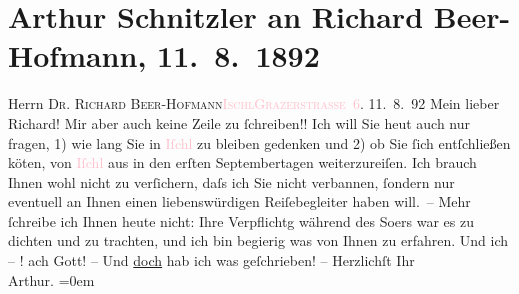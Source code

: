 

               \section[Arthur Schnitzler an Richard Beer-Hofmann, 11. 8. 1892]{ Arthur Schnitzler an Richard Beer-Hofmann, 11. 8. 1892}\nopagebreak{}\rehead{ }\normalsize\beginnumbering{} \toendnotes[C]{\smallbreak\pagebreak[2]} 
\pstart{}{\pb}Herrn \textsc{Dr. Richard
                     Beer-Hofmann}\pend{}\pstart{}\textsc{\textcolor{pink}{Ischl}{}\ledrightnote{\textcolor{pink}{Bad Ischl}}}\pend{}\pstart{}\textsc{\textcolor{pink}{Grazerstraße 6}{}\ledrightnote{\textcolor{pink}{Grazer Straße}}}.\pend{}{\bigskip}\pstart
           \raggedleft{}{\pb}11. 8. 92\pend
           \pstart
           Mein lieber Richard! Mir aber auch keine Zeile zu ſchreiben!! Ich
               will Sie heut auch nur fragen, 1) wie lang Sie in \textcolor{pink}{Iſchl}{}\ledrightnote{\textcolor{pink}{Bad Ischl}} zu bleiben gedenken und 2) ob Sie ſich entſchließen kö{\geminationn}ten, von \textcolor{pink}{Iſchl}{}\ledrightnote{\textcolor{pink}{Bad Ischl}} aus in
               den erſten Septembertagen weiterzureiſen. Ich brauch Ihnen wohl nicht zu verſichern,
               daſs ich Sie nicht verbannen, ſondern nur eventuell \introOben{}an Ihnen\introOben{}
               einen liebenswürdigen Reiſebegleiter haben will. –\pend
           \pstart
           Mehr ſchreibe ich Ihnen heute nicht: Ihre Verpflichtg während des So{\geminationm}ers war es zu dichten und zu trachten, und ich bin
               begierig was von Ihnen zu erfahren. Und ich – ! ach Gott! – Und \uline{doch} hab ich was geſchrieben! –\pend
           \pstart
           Herzlichſt Ihr{\\[\baselineskip]}\spacefill\mbox{Arthur.}\pend
           \leftskip=0em{}\endnumbering{}  
      